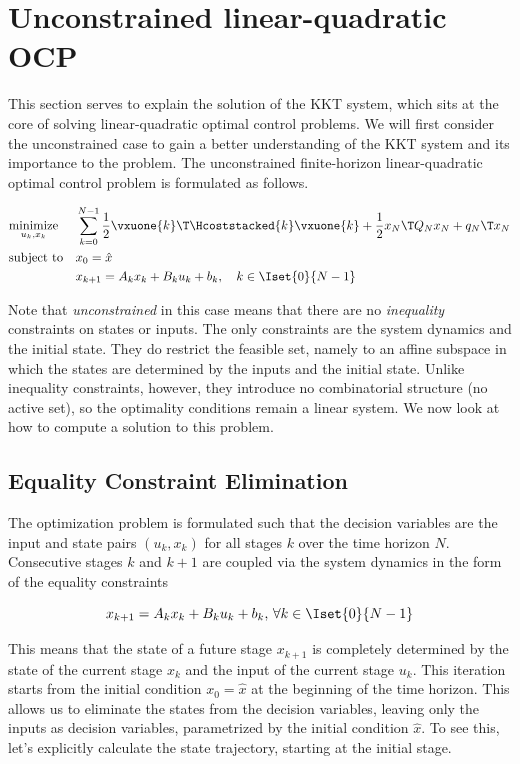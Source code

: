\section{Unconstrained linear-quadratic OCP}

This section serves to explain the solution of the KKT system, which sits at the core of solving linear-quadratic optimal control problems.
We will first consider the unconstrained case to gain a better understanding of the KKT system and its importance to the problem.
The unconstrained finite-horizon linear-quadratic optimal control problem is formulated as follows.

\[
\begin{aligned}
    & \underset{u_k, x_k}{\text{minimize}} & & \sum_{k=0}^{N-1} \frac{1}{2} \vxuone{k}\T \Hcoststacked{k} \vxuone{k} + \frac{1}{2} x_N\T Q_N x_N + q_N\T x_N \\
    & \text{subject to} & & x_0 = \hat{x}\\
    & & & x_{k+1} = A_k x_k + B_k u_k + b_k, \quad k \in \Iset{0}{N-1}
\end{aligned}
\]

Note that \textit{unconstrained} in this case means that there are no \textit{inequality} constraints on states or inputs.
The only constraints are the system dynamics and the initial state.
They do restrict the feasible set, namely to an affine subspace in which the states are determined by the inputs and the initial state.
Unlike inequality constraints, however, they introduce no combinatorial structure (no active set), so the optimality conditions remain a linear system.
We now look at how to compute a solution to this problem.

\subsection{Equality Constraint Elimination}

The optimization problem is formulated such that the decision variables are the input and state pairs $(u_k, x_k)$ for all stages $k$ over the time horizon $N$.
Consecutive stages $k$ and $k+1$ are coupled via the system dynamics in the form of the equality constraints

\[
x_{k+1} = A_k x_k + B_k u_k + b_k, \, \forall k\in\Iset{0}{N-1}
\]

This means that the state of a future stage $x_{k+1}$ is completely determined by the state of the current stage $x_k$ and the input of the current stage $u_k$.
This iteration starts from the initial condition $x_0 = \hat{x}$ at the beginning of the time horizon.
This allows us to eliminate the states from the decision variables, leaving only the inputs as decision variables, parametrized by the initial condition $\hat{x}$.
To see this, let's explicitly calculate the state trajectory, starting at the initial stage.

